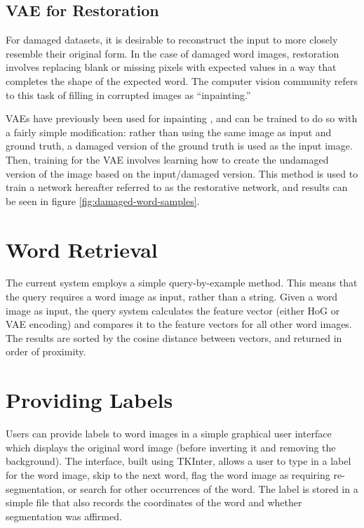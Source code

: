 \documentclass[final]{ukthesis}
\begin{document}
\subsection{VAE for Restoration}
For damaged datasets, it is desirable to reconstruct the input to more closely resemble their original form. In the case of damaged word images, restoration involves replacing blank or missing pixels with expected values in a way that completes the shape of the expected word. The computer vision community refers to this task of filling in corrupted images as ``inpainting.''

VAEs have previously been used for inpainting \cite{xie2012image}, and can be trained to do so with a fairly simple modification: rather than using the same image as input and ground truth, a damaged version of the ground truth is used as the input image. Then, training for the VAE involves learning how to create the undamaged version of the image based on the input/damaged version. This method is used to train a network hereafter referred to as the restorative network, and results can be seen in figure \ref{fig:damaged-word-samples}.


%
%
\section{Word Retrieval}
The current system employs a simple query-by-example method. This means that the query requires a word image as input, rather than a string. Given a word image as input, the query system calculates the feature vector (either HoG or VAE encoding) and compares it to the feature vectors for all other word images. The results are sorted by the cosine distance between vectors, and returned in order of proximity.



%
%
\section{Providing Labels}
Users can provide labels to word images in a simple graphical user interface which displays the original word image (before inverting it and removing the background). The interface, built using TKInter, allows a user to type in a label for the word image, skip to the next word, flag the word image as requiring re-segmentation, or search for other occurrences of the word. The label is stored in a simple file that also records the coordinates of the word and whether segmentation was affirmed.
\end{document}
